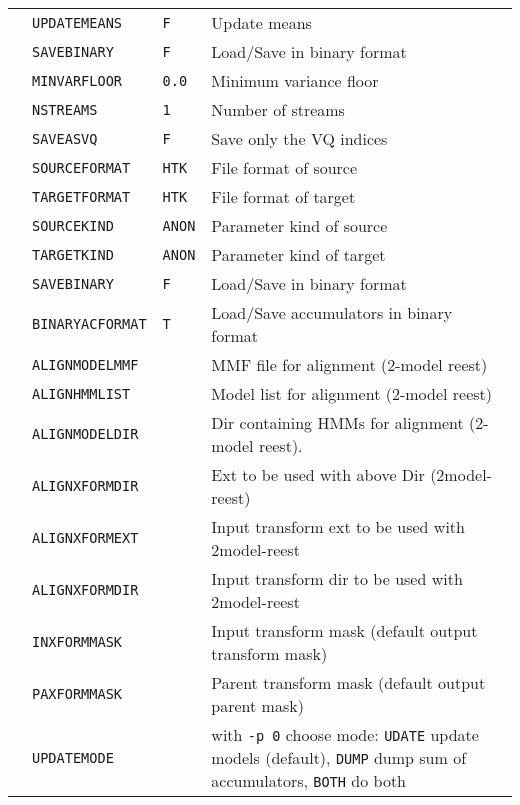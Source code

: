 \newpage
{}

\begin{center}
\tabletail{\hline}
\begin{supertabular}{|p{1.4cm}|l|l|p{6.6cm}|}

  & \texttt{UPDATEMEANS} & \texttt{F} & Update means \\ 
 & \texttt{SAVEBINARY} & \texttt{F} & Load/Save in binary format \\ 
  & \texttt{MINVARFLOOR} & \texttt{0.0} & Minimum variance floor \\ \hline

  & \texttt{NSTREAMS} & \texttt{1} & Number of streams \\ 
  & \texttt{SAVEASVQ} & \texttt{F} & Save only the VQ indices \\ 
 & \texttt{SOURCEFORMAT} & \texttt{HTK} & File format of source \\ 
  & \texttt{TARGETFORMAT} & \texttt{HTK} & File format of target \\ 
  & \texttt{SOURCEKIND} & \texttt{ANON} & Parameter kind of source \\ 
  & \texttt{TARGETKIND} & \texttt{ANON} & Parameter kind of target \\ \hline

  & \texttt{SAVEBINARY} & \texttt{F} & Load/Save in binary format \\ 
  & \texttt{BINARYACFORMAT} & \texttt{T} & Load/Save accumulators in binary format \\ 
  & \texttt{ALIGNMODELMMF} & & MMF file for alignment (2-model reest)  \\ 
  & \texttt{ALIGNHMMLIST}  & & Model list for alignment (2-model reest) \\ 
  & \texttt{ALIGNMODELDIR} & & Dir containing HMMs for alignment (2-model reest).  \\ 
  & \texttt{ALIGNXFORMDIR} & & Ext to be used with above Dir (2model-reest) \\  
  & \texttt{ALIGNXFORMEXT} & & Input transform ext to be used with 2model-reest \\  
  & \texttt{ALIGNXFORMDIR} & & Input transform dir to be used with 2model-reest \\  
  & \texttt{INXFORMMASK} & & Input transform mask (default output transform mask) \\  
  & \texttt{PAXFORMMASK} & & Parent transform mask (default output parent mask) \\  
  & \texttt{UPDATEMODE} & & with \texttt{-p 0} choose mode:
  \texttt{UDATE} update models (default), \texttt{DUMP} dump sum of
  accumulators, \texttt{BOTH} do both\\   
\hline


\end{supertabular}
\end{center}
